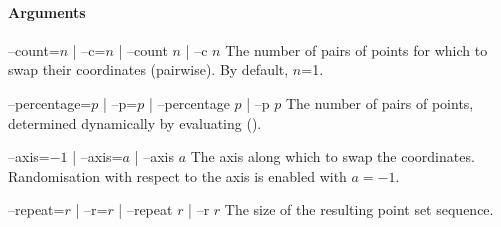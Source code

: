 \paragraph{Arguments}

\begin{procarg}{--count=$n$ | --c=$n$ | --count $n$ | –c $n$}
  The number of pairs of points for which to swap their coordinates (pairwise). By default, $n$=1.
\end{procarg}

\begin{procarg}{--percentage=$p$ | --p=$p$ | --percentage $p$ | –p $p$}
  The number of pairs of points, determined dynamically by evaluating ().
\end{procarg}

\begin{procarg}{--axis=$-1$ | --axis=$a$ | --axis $a$}
  The axis along which to swap the coordinates. Randomisation with respect to the axis is enabled with $a=-1$.
\end{procarg}

\begin{procarg}{--repeat=$r$ | --r=$r$ | --repeat $r$ | --r $r$}
  The size of the resulting point set sequence.
\end{procarg}


\procargout

\procargdelimiter

\procargsilent


